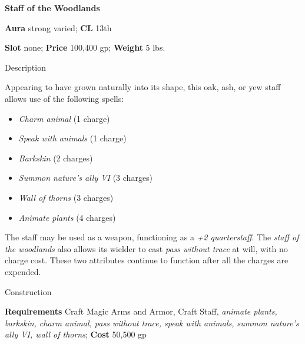 \textbf{Staff of the Woodlands}
				
\textbf{Aura} strong varied; \textbf{CL} 13th
				
\textbf{Slot} none; \textbf{Price} 100,400 gp; \textbf{Weight} 5 lbs.
				
Description
				
Appearing to have grown naturally into its shape, this oak, ash, or yew staff allows use of the following spells:
				\begin{itemize}\item  \textit{Charm animal} (1 charge)
				\item  \textit{Speak with animals} (1 charge)
				\item  \textit{Barkskin} (2 charges)
				\item  \textit{Summon nature's ally VI} (3 charges)
				\item  \textit{Wall of thorns} (3 charges)
				\item  \textit{Animate plants} (4 charges)
\end{itemize}
				
The staff may be used as a weapon, functioning as a \textit{+2 quarterstaff}. The \textit{staff of the woodlands} also allows its wielder to cast \textit{pass without trace} at will, with no charge cost. These two attributes continue to function after all the charges are expended. 
				
Construction
				
\textbf{Requirements} Craft Magic Arms and Armor, Craft Staff, \textit{animate plants, barkskin, charm animal, pass without trace, speak with animals, summon nature's ally VI, wall of thorns}; \textbf{Cost }50,500 gp
        	
